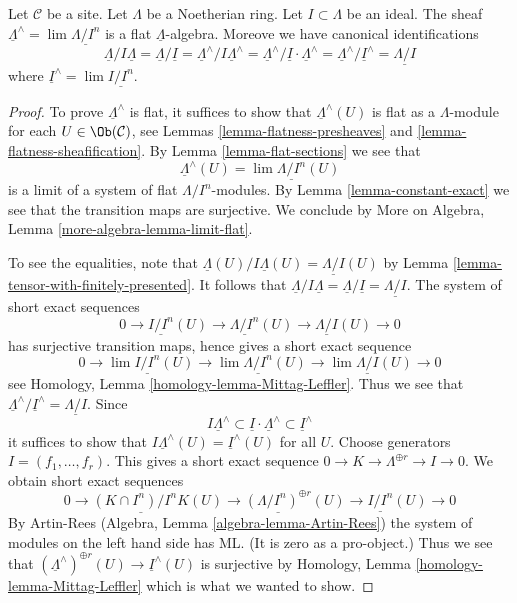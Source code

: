 \begin{lemma}
\label{lemma-completion-flat}
Let $\mathcal{C}$ be a site. Let $\Lambda$ be a Noetherian ring.
Let $I \subset \Lambda$ be an ideal. The sheaf
$\underline{\Lambda}^\wedge = \lim \underline{\Lambda/I^n}$
is a flat $\underline{\Lambda}$-algebra.
Moreove we have canonical identifications
$$
\underline{\Lambda}/I\underline{\Lambda} =
\underline{\Lambda}/\underline{I} =
\underline{\Lambda}^\wedge/I\underline{\Lambda}^\wedge =
\underline{\Lambda}^\wedge/\underline{I} \cdot \underline{\Lambda}^\wedge =
\underline{\Lambda}^\wedge/\underline{I}^\wedge =
\underline{\Lambda/I}
$$
where $\underline{I}^\wedge = \lim \underline{I/I^n}$.
\end{lemma}

\begin{proof}
To prove $\underline{\Lambda}^\wedge$ is flat, it suffices to show that
$\underline{\Lambda}^\wedge(U)$ is flat as a $\Lambda$-module for each
$U \in \Ob(\mathcal{C})$, see
Lemmas \ref{lemma-flatness-presheaves} and
\ref{lemma-flatness-sheafification}.
By Lemma \ref{lemma-flat-sections} we see that
$$
\underline{\Lambda}^\wedge(U) = \lim \underline{\Lambda/I^n}(U)
$$
is a limit of a system of flat $\Lambda/I^n$-modules.
By Lemma \ref{lemma-constant-exact} we see that the transition maps
are surjective. We conclude by
More on Algebra, Lemma \ref{more-algebra-lemma-limit-flat}.

\medskip\noindent
To see the equalities, note that
$\underline{\Lambda}(U)/I\underline{\Lambda}(U) = \underline{\Lambda/I}(U)$
by Lemma \ref{lemma-tensor-with-finitely-presented}.
It follows that $\underline{\Lambda}/I\underline{\Lambda} =
\underline{\Lambda}/\underline{I} = \underline{\Lambda/I}$. The system
of short exact sequences
$$
0 \to \underline{I/I^n}(U) \to \underline{\Lambda/I^n}(U) \to
\underline{\Lambda/I}(U) \to 0
$$
has surjective transition maps, hence gives a short exact sequence
$$
0 \to \lim \underline{I/I^n}(U) \to \lim \underline{\Lambda/I^n}(U) \to
\lim \underline{\Lambda/I}(U) \to 0
$$
see Homology, Lemma \ref{homology-lemma-Mittag-Leffler}. Thus we see that
$\underline{\Lambda}^\wedge/\underline{I}^\wedge =
\underline{\Lambda/I}$. Since
$$
I \underline{\Lambda}^\wedge \subset
\underline{I} \cdot \underline{\Lambda}^\wedge \subset
\underline{I}^\wedge
$$
it suffices to show that
$I \underline{\Lambda}^\wedge(U) = \underline{I}^\wedge(U)$
for all $U$. Choose generators $I = (f_1, \ldots, f_r)$. This gives a
short exact sequence $0 \to K \to \Lambda^{\oplus r} \to I \to 0$.
We obtain short exact sequences
$$
0 \to \underline{(K \cap I^n)/I^nK}(U) \to
\underline{(\Lambda/I^n)^{\oplus r}}(U) \to
\underline{I/I^n}(U) \to 0
$$
By Artin-Rees (Algebra, Lemma \ref{algebra-lemma-Artin-Rees})
the system of modules on the left hand side has ML. (It is
zero as a pro-object.) Thus we see that
$(\underline{\Lambda}^\wedge)^{\oplus r}(U) \to \underline{I}^\wedge(U)$
is surjective by
Homology, Lemma \ref{homology-lemma-Mittag-Leffler}
which is what we wanted to show.
\end{proof}

